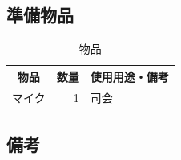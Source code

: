 \subsection{準備物品}
\begin{table}[h]
  \centering
  \caption{物品}
  \begin{tabular}{lrl}
    \hline
    \multicolumn{1}{c}{物品} & \multicolumn{1}{c}{数量} & \multicolumn{1}{c}{使用用途・備考} \\
    \hline
    マイク & 1 & 司会 \\
    \hline  
  \end{tabular}
\end{table}

\subsection{備考}
